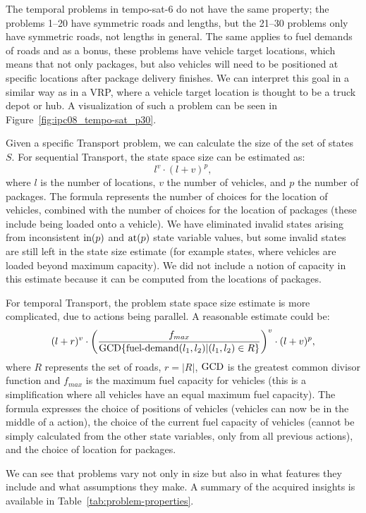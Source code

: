 The temporal problems in tempo-sat-6 do not have the same property;
the problems 1--20 have symmetric roads and lengths, but
the 21--30 problems only have symmetric roads, not lengths in general.
The same applies to fuel demands of roads and as a bonus,
these problems have vehicle target locations, which means that not only packages,
but also
vehicles will need to be positioned at specific locations
after package delivery finishes. We can interpret this goal
in a similar way as in a VRP, where a vehicle target location is thought to be
a truck depot or hub. A visualization of such a problem can be seen in Figure~\ref{fig:ipc08_tempo-sat_p30}.

Given a specific Transport problem, we can calculate the size of the set of states $S$.
For sequential Transport, the state space size can be estimated as: $$l^v \cdot (l+v)^p,$$ where $l$ is the number of locations,
$v$ the number of vehicles, and $p$ the number of packages. The formula represents
the number of choices for the location of vehicles, combined with the number of choices
for the location of packages (these include being loaded onto a vehicle). We have eliminated
invalid states arising from inconsistent $\textrm{in}(p)$ and $\textrm{at}(p)$ state variable values,
but some invalid states are still left in the state size estimate (for example states,
where vehicles are loaded beyond maximum capacity). We did not include a notion of
capacity in this estimate because it can be computed from the locations of packages.

For temporal Transport, the problem state space size estimate is more complicated,
due to actions being parallel. A reasonable estimate could be:
$$(l+r)^v \cdot \left(\frac{f_{max}}{\textrm{GCD} \{\textrm{fuel-demand}(l_1, l_2) | (l_1, l_2) \in R\}}\right)^v \cdot (l+v)^p,$$ where $R$ represents the set of roads, $r = |R|$,
$\textrm{GCD}$ is the greatest common divisor function
and $f_{max}$ is the maximum fuel capacity for vehicles (this is a simplification where all vehicles
have an equal maximum fuel capacity).
The formula expresses the choice of positions of vehicles (vehicles can now be in the middle
of a \drive{} action), the choice of the current fuel capacity of vehicles (cannot be simply
calculated from the other state variables, only from all previous actions),
and the choice of location for packages.

We can see that problems vary not only in size but also in what features they include
and what assumptions they make.
A summary of the acquired insights is available in Table~\ref{tab:problem-properties}.

